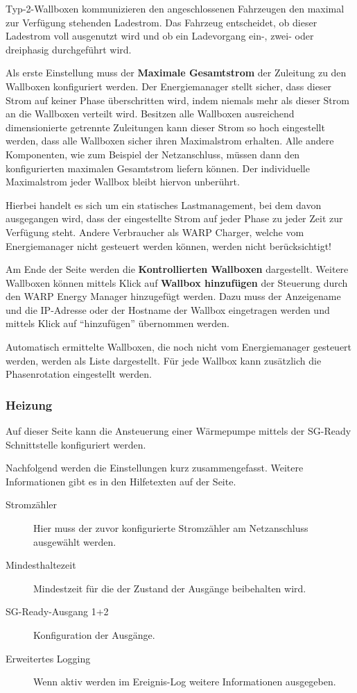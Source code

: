 \documentclass[a4paper,10pt]{article}
\newcommand{\hint}[1]{\begin{tcolorbox}[colback=boxgray,colframe=black,coltext=
white,title=Hinweis,left*=2mm,right*=2mm,boxsep=1mm,bottom=1mm,top=1mm]#1\end{tcolorbox}}
\begin{document}
\begin{multicols*}{2}
	Typ-2-Wallboxen kommunizieren den angeschlossenen Fahrzeugen den maximal zur
	Verfügung stehenden Ladestrom. Das Fahrzeug entscheidet, ob dieser Ladestrom
	voll ausgenutzt wird und ob ein Ladevorgang ein-, zwei- oder dreiphasig durchgeführt
	wird.

	Als erste Einstellung muss der \textbf{Maximale Gesamtstrom}
	der Zuleitung zu den Wallboxen konfiguriert werden.
	Der Energiemanager stellt sicher, dass dieser
	Strom auf keiner Phase überschritten wird, indem niemals mehr als
	dieser Strom an die Wallboxen verteilt wird. Besitzen alle Wallboxen
	ausreichend dimensionierte getrennte Zuleitungen kann dieser Strom so
	hoch eingestellt werden, dass alle Wallboxen sicher ihren Maximalstrom
	erhalten. Alle andere Komponenten, wie zum Beispiel der Netzanschluss,
	müssen dann den konfigurierten maximalen Gesamtstrom liefern können.
	Der individuelle Maximalstrom jeder Wallbox bleibt hiervon unberührt.

	\hint{Hierbei handelt es sich um ein statisches Lastmanagement, bei dem
	davon ausgegangen wird, dass der eingestellte Strom auf jeder Phase
	zu jeder Zeit zur Verfügung steht. Andere Verbraucher als WARP Charger,
	welche vom Energiemanager nicht gesteuert werden können, werden nicht
	berücksichtigt!}

	Am Ende der Seite werden die \textbf{Kontrollierten
	Wallboxen} dargestellt. Weitere Wallboxen können mittels Klick auf
	\textbf{Wallbox hinzufügen} der Steuerung durch den WARP Energy Manager
	hinzugefügt werden. Dazu muss der Anzeigename und die IP-Adresse oder der
	Hostname der Wallbox eingetragen werden und mittels Klick auf \enquote{hinzufügen} übernommen werden.

	Automatisch ermittelte Wallboxen, die noch nicht vom Energiemanager
	gesteuert werden, werden als Liste dargestellt. Für jede Wallbox kann zusätzlich
    die Phasenrotation eingestellt werden.

    \subsubsection{Heizung}
    Auf dieser Seite kann die Ansteuerung einer Wärmepumpe mittels der SG-Ready Schnittstelle konfiguriert werden.
    
    Nachfolgend werden die Einstellungen kurz zusammengefasst. Weitere Informationen gibt es in den Hilfetexten
    auf der Seite.
    
   	\begin{description}
    \item[Stromzähler] Hier muss der zuvor konfigurierte Stromzähler am Netzanschluss ausgewählt werden.
    \item[Mindesthaltezeit] Mindestzeit für die der Zustand der Ausgänge beibehalten wird.
    \item[SG-Ready-Ausgang 1+2] Konfiguration der Ausgänge.
    \item[Erweitertes Logging] Wenn aktiv werden im Ereignis-Log weitere Informationen ausgegeben. 
   	\end{description}


\end{multicols*}
\end{document}
